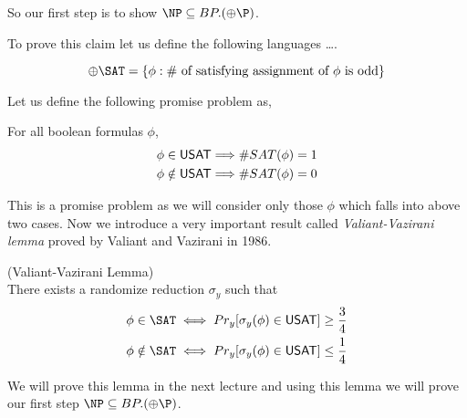 So our first step is to show $\NP \subseteq BP.(\oplus \P)$.

To prove this claim let us define the following languages \ldots.
\begin{definition} 
\[ \oplus \SAT = \{ \phi : \# \text{ of satisfying assignment of }
\phi \text{ is odd} \}\]
\end{definition}

Let us define the following promise problem \USAT as,
\begin{definition}
For all boolean formulas $\phi$,
\begin{align*}
\phi & \in {\sf USAT} \Longrightarrow \#SAT(\phi)=1\\
\phi & \notin {\sf USAT} \Longrightarrow \#SAT(\phi)=0
\end{align*}
\end{definition}

This is a promise problem as we will consider only those $\phi$ which 
falls into above two cases. Now we introduce a very important result called 
\emph{Valiant-Vazirani lemma} proved by Valiant and Vazirani in 1986.

\begin{lemma}(Valiant-Vazirani Lemma) \\
There exists a randomize reduction $\sigma_y$ such that
\begin{align*}
\phi & \in \SAT \iff Pr_y[\sigma_y(\phi) \in \USAT] \ge \frac{3}{4}\\
\phi & \notin \SAT \iff Pr_y[\sigma_y(\phi) \in \USAT] \le \frac{1}{4}
\end{align*}
\end{lemma}
We will prove this lemma in the next lecture and using this lemma 
we will prove our first step $\NP \subseteq BP.(\oplus\P)$.
